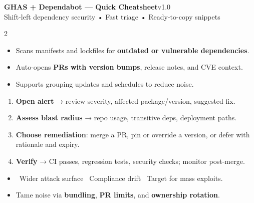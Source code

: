 \documentclass[11pt,letterpaper]{article}
\renewcommand{\xmark}{\textcolor{BrickRed}{\ding{55}}}
\begin{document}
\begin{headlinebox}
{\Large\bfseries GHAS + Dependabot --- Quick Cheatsheet}\hfill {\small v1.0}\\
{\small Shift-left dependency security • Fast triage • Ready-to-copy snippets}
\end{headlinebox}

\vspace{0.4em}

\begin{multicols}{2}
\small\raggedright

\begin{tcolorbox}[title=\bfseries What Dependabot Does]
\raggedright
\begin{itemize}
  \item Scans manifests and lockfiles for \textbf{outdated or vulnerable dependencies}.
  \item Auto-opens \textbf{PRs with version bumps}, release notes, and CVE context.
  \item Supports grouping updates and schedules to reduce noise.
\end{itemize}
\end{tcolorbox}

\begin{tcolorbox}[title=\bfseries Fast Triage Flow (Alerts)]
\raggedright
\begin{enumerate}
  \item \textbf{Open alert} → review severity, affected package/version, suggested fix.
  \item \textbf{Assess blast radius} → repo usage, transitive deps, deployment paths.
  \item \textbf{Choose remediation}: merge a PR, pin or override a version, or defer with rationale and expiry.
  \item \textbf{Verify} → CI passes, regression tests, security checks; monitor post-merge.
\end{enumerate}
\end{tcolorbox}

\begin{tcolorbox}[title=\bfseries If You Ignore Alerts]
\begin{itemize}
  \item \xmark\ Wider attack surface \quad \xmark\ Compliance drift \quad \xmark\ Target for mass exploits.
  \item Tame noise via \textbf{bundling}, \textbf{PR limits}, and \textbf{ownership rotation}.
\end{itemize}
\end{tcolorbox}


\end{multicols}
\end{document}
